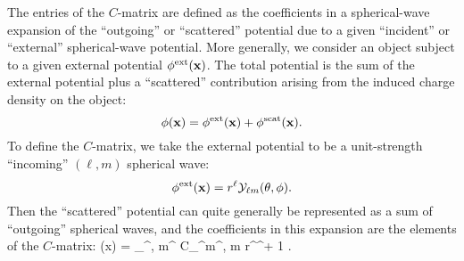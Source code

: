\documentclass[letterpaper]{article}
\newcommand{\YY}{\mc Y}
\begin{document}
The entries of the $C$-matrix are defined as the coefficients
in a spherical-wave expansion of the ``outgoing'' or 
``scattered'' potential due to a given ``incident'' or
``external'' spherical-wave potential. More generally,
we consider an object subject to a given external potential 
$\phi^{\hbox{\scriptsize{ext}}}(\mathbf{x})$. The total potential is the sum
of the external potential plus a ``scattered'' contribution
arising from the induced charge density on the object:
\begin{equation}
\phi(\mathbf{x}) = \phi^{\hbox{\scriptsize{ext}}}(\mathbf{x}) + \phi^{\hbox{\scriptsize{scat}}}(\mathbf{x}).
\end{equation}
To define the $C$-matrix, we take the external potential 
to be a unit-strength ``incoming'' $(\ell, m)$ spherical wave:
\begin{equation}
\phi\sups{ext}(\vb x)=r^{\ell} \YY_{\ell m}(\theta, \phi).
\end{equation}
Then the ``scattered'' potential can quite generally be 
represented as a sum of ``outgoing'' spherical waves, and the 
coefficients in this expansion are the elements of the 
$C$-matrix:
{\phi{}(\vb x) 
   = \sum_{\ell^\prime, m^\prime}
     C_{\ell^\prime m^\prime, \ell m} 
           \frac{\YY_{\ell^\prime m^\prime}(\theta, \phi)}
                {r^{\ell^\prime + 1 }}.
}
\end{document}
